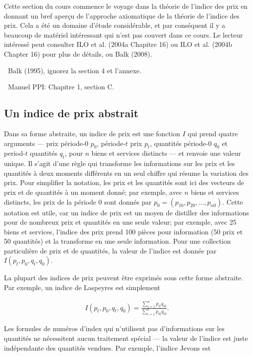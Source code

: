 \documentclass[]{article}
\begin{document}
Cette section du cours commence le voyage dans la théorie de l'indice des prix en donnant un bref aperçu de l'approche axiomatique de la théorie de l'indice des prix. Cela a été un domaine d'étude considérable, et par conséquent il y a beaucoup de matériel intéressant qui n'est pas couvert dans ce cours. Le lecteur intéressé peut consulter ILO et al. (2004a Chapitre 16) ou ILO et al. (2004b Chapter 16) pour plus de détails, ou Balk (2008).

📖 Balk (1995), ignorez la section 4 et l'annexe.

📖 Manuel PPI: Chapitre 1, section C.

\hypertarget{un-indice-de-prix-abstrait}{%
\subsection{Un indice de prix abstrait}\label{un-indice-de-prix-abstrait}}

Dans sa forme abstraite, un indice de prix est une fonction \(I\) qui prend quatre arguments --- prix période-0 \(p_{0}\), période-\(t\) prix \(p_{t}\), quantités période-0 \(q_{0}\) et period-\(t\) quantités \(q_{t}\), pour \(n\) biens et services distincts --- et renvoie une valeur unique. Il s'agit d'une règle qui transforme les informations sur les prix et les quantités à deux moments différents en un seul chiffre qui résume la variation des prix. Pour simplifier la notation, les prix et les quantités sont ici des vecteurs de prix et de quantités à un moment donné; par exemple, avec \(n\) biens et services distincts, les prix de la période 0 sont donnés par \(p_0 = (p_{10}, p_{20}, \ldots, p_{n0})\). Cette notation est utile, car un indice de prix est un moyen de distiller des informations pour de nombreux prix et quantités en une seule valeur; par exemple, avec 25 biens et services, l'indice des prix prend 100 pièces pour information (50 prix et 50 quantités) et la transforme en une seule information. Pour une collection particulière de prix et de quantités, la valeur de l'indice est donnée par \(I(p_{t}, p_{0}, q_{t}, q_{0})\).

La plupart des indices de prix peuvent être exprimés sous cette forme abstraite. Par exemple, un indice de Laspeyres est simplement

\begin{align*}
I(p_{t}, p_{0}, q_{t}, q_{0}) = \frac{\sum_{i = 1}^{n} p_{it} q_{i0}} {\sum_{i = 1}^{n} p_{i0} q_{i0}}.
\end{align*}

Les formules de numéros d'index qui n'utilisent pas d'informations sur les quantités ne nécessitent aucun traitement spécial --- la valeur de l'indice est juste indépendante des quantités vendues. Par exemple, l'indice Jevons est
\end{document}
